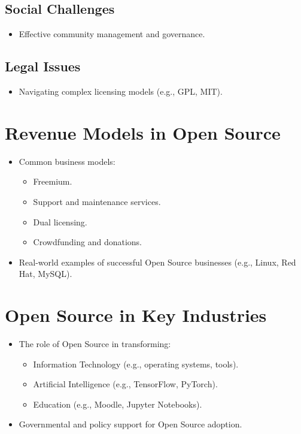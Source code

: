 \subsection{Social Challenges}

\begin{itemize}
    \item Effective community management and governance.
\end{itemize}
\subsection{Legal Issues}

\begin{itemize}
    \item Navigating complex licensing models (e.g., GPL, MIT).
\end{itemize}

\section{Revenue Models in Open Source}

\begin{itemize}
    \item Common business models:
    \begin{itemize}
        \item Freemium.
        \item Support and maintenance services.
        \item Dual licensing.
        \item Crowdfunding and donations.
    \end{itemize}
    \item Real-world examples of successful Open Source businesses (e.g., Linux, Red Hat, MySQL).
\end{itemize}

\section{Open Source in Key Industries}

\begin{itemize}
    \item The role of Open Source in transforming:
    \begin{itemize}
        \item Information Technology (e.g., operating systems, tools).
        \item Artificial Intelligence (e.g., TensorFlow, PyTorch).
        \item Education (e.g., Moodle, Jupyter Notebooks).
    \end{itemize}
    \item Governmental and policy support for Open Source adoption.
\end{itemize}

